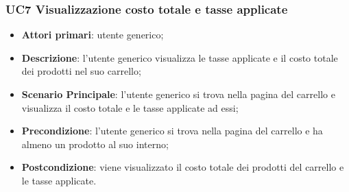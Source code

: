 \subsubsection{UC7 Visualizzazione costo totale e tasse applicate}
\begin{itemize}
\item \textbf{Attori primari}: utente generico;
\item \textbf{Descrizione}: l'utente generico visualizza le tasse applicate e il costo totale dei prodotti nel suo carrello;
\item \textbf{Scenario Principale}: l'utente generico si trova nella pagina del carrello e visualizza il costo totale e le tasse applicate ad essi;
\item \textbf{Precondizione}: l'utente generico si trova nella pagina del carrello e ha almeno un prodotto al suo interno;
\item \textbf{Postcondizione}: viene visualizzato il costo totale dei prodotti del carrello e le tasse applicate.
\end{itemize}




